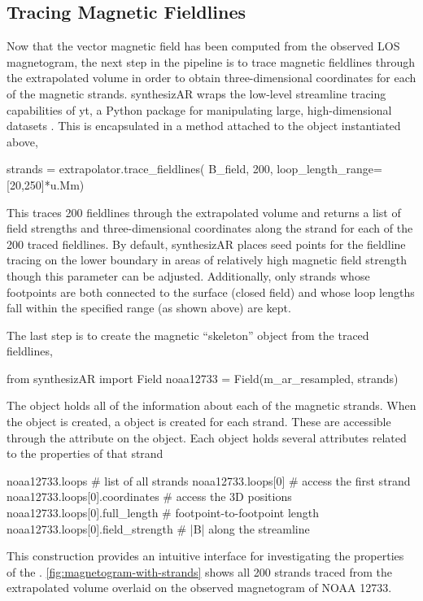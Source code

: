 \subsection{Tracing Magnetic Fieldlines}\label{sec:trace-fieldlines}

Now that the vector magnetic field has been computed from the observed LOS magnetogram, the next step in the pipeline is to trace magnetic fieldlines through the extrapolated volume in order to obtain three-dimensional coordinates for each of the magnetic strands. synthesizAR wraps the low-level streamline tracing capabilities of yt, a Python package for manipulating large, high-dimensional datasets \citep{turk_yt_2011}. This is encapsulated in a method attached to the  object instantiated above,
\begin{pyblock}[chapter4][baselinestretch=1,xleftmargin=3em]
strands = extrapolator.trace_fieldlines(
    B_field, 200, loop_length_range=[20,250]*u.Mm)
\end{pyblock}
This traces 200 fieldlines through the extrapolated volume and returns a list of field strengths and three-dimensional coordinates along the strand for each of the 200 traced fieldlines. By default, synthesizAR places seed points for the fieldline tracing on the lower boundary in areas of relatively high magnetic field strength though this parameter can be adjusted. Additionally, only strands whose footpoints are both connected to the surface (closed field) and whose loop lengths fall within the specified range (as shown above) are kept.

The last step is to create the magnetic ``skeleton'' object from the traced fieldlines,
\begin{pyblock}[chapter4][baselinestretch=1,xleftmargin=3em]
from synthesizAR import Field
noaa12733 = Field(m_ar_resampled, strands)
\end{pyblock}
The  object holds all of the information about each of the magnetic strands. When the  object is created, a  object is created for each strand. These are accessible through the  attribute on the  object. Each  object holds several attributes related to the properties of that strand
\begin{pyblock}[chapter4][baselinestretch=1,xleftmargin=3em]
noaa12733.loops  # list of all strands
noaa12733.loops[0]  # access the first strand
noaa12733.loops[0].coordinates  # access the 3D positions
noaa12733.loops[0].full_length  # footpoint-to-footpoint length
noaa12733.loops[0].field_strength  # |B| along the streamline
\end{pyblock}
This construction provides an intuitive interface for investigating the properties of the \AR{}. \autoref{fig:magnetogram-with-strands} shows all 200 strands traced from the extrapolated volume overlaid on the observed magnetogram of NOAA 12733. 

